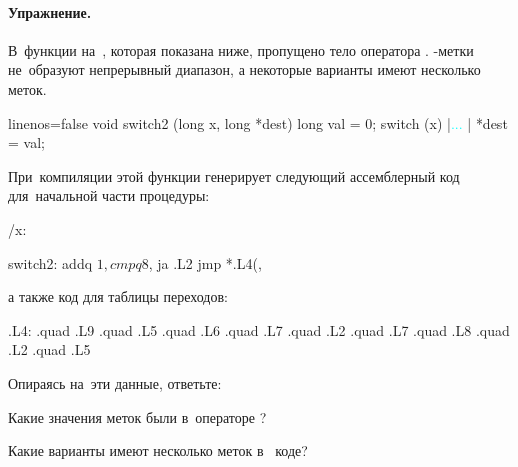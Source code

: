 \paragraph{Упражнение.}
В~функции на~, которая показана ниже, пропущено тело оператора . -метки не~образуют непрерывный диапазон, а некоторые варианты имеют несколько меток.

{\newcommand*{\ans}{\ansdots}%
%
\begin{ccode*}{linenos=false}
void switch2 (long x, long *dest)
{
  long val = 0;
  switch (x)
  {
    |\textcolor{cyan}{...}  |
  }
  *dest = val;
}
\end{ccode*}
}

\noindent При~компиляции этой функции \GCC{} генерирует следующий ассемблерный код для~начальной части процедуры:

\precomment/x: %
\vspace{-1.7\baselineskip}
\begin{gascode}
switch2:
  addq  $1, %
  cmpq  $8, %
  ja    .L2
  jmp   *.L4(,%
\end{gascode}

\noindent а также код для таблицы переходов:

\begin{gascode}
.L4:
  .quad  .L9
  .quad  .L5
  .quad  .L6
  .quad  .L7
  .quad  .L2
  .quad  .L7
  .quad  .L8
  .quad  .L2
  .quad  .L5
\end{gascode}

\noindent Опираясь на~эти данные, ответьте:
\begin{enumIssue}
\item Какие значения меток были в~операторе ?
\item Какие варианты имеют несколько меток в~ коде?
\end{enumIssue}



\WhatToReadSection
\citeauthor[глава~3, стр.~242--250]{Bryant:2022:ru}




